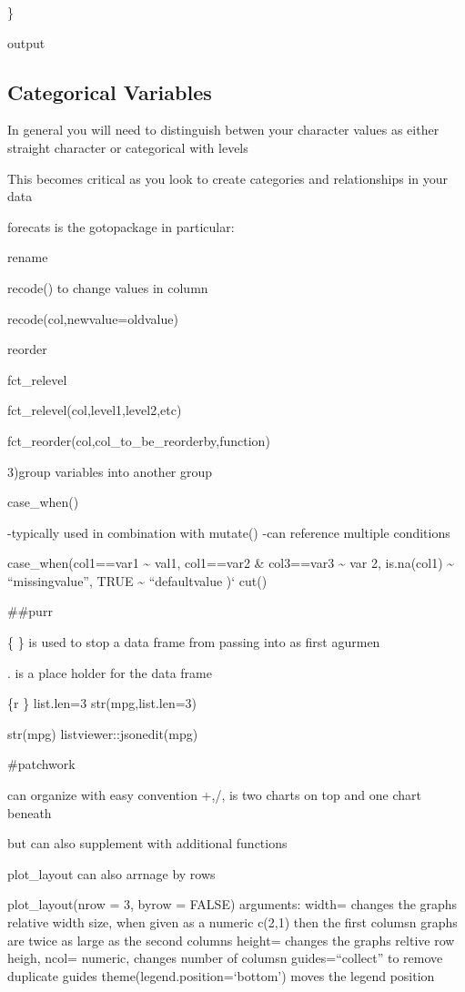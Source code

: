\documentclass[
  letterpaper,
  DIV=11,
  numbers=noendperiod]{scrreprt}
\begin{document}
\}

output

\subsection{Categorical Variables}\label{categorical-variables}

In general you will need to distinguish betwen your character values as
either straight character or categorical with levels

This becomes critical as you look to create categories and relationships
in your data

forecats is the gotopackage in particular:

rename

recode() to change values in column

recode(col,newvalue=oldvalue)

reorder

fct\_relevel

fct\_relevel(col,level1,level2,etc)

fct\_reorder(col,col\_to\_be\_reorderby,function)

3)group variables into another group

case\_when()

-typically used in combination with mutate() -can reference multiple
conditions

case\_when(col1==var1 \textasciitilde{} val1, col1==var2 \& col3==var3
\textasciitilde{} var 2, is.na(col1) \textasciitilde{} ``missingvalue'',
TRUE \textasciitilde{} ``defaultvalue )` cut()

\#\#purr

\{ \} is used to stop a data frame from passing into as first agurmen

. is a place holder for the data frame

\{r \} list.len=3 str(mpg,list.len=3)

str(mpg) listviewer::jsonedit(mpg)

\#patchwork

can organize with easy convention +,/,\textbar{} is two charts on top
and one chart beneath

but can also supplement with additional functions

plot\_layout can also arrnage by rows

plot\_layout(nrow = 3, byrow = FALSE) arguments: width= changes the
graphs relative width size, when given as a numeric c(2,1) then the
first columsn graphs are twice as large as the second columns height=
changes the graphs reltive row heigh, ncol= numeric, changes number of
columsn guides=``collect'' to remove duplicate guides
theme(legend.position=`bottom') moves the legend position
\end{document}
